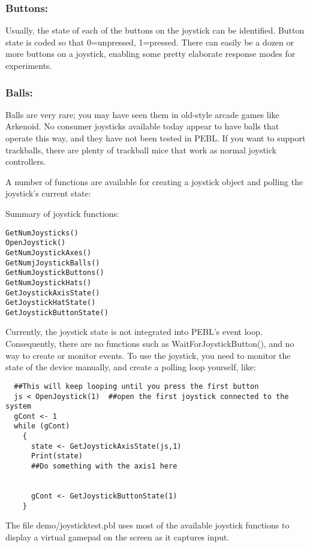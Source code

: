 \subsubsection{Buttons:}
  Usually, the state of each of the buttons on the joystick can be identified.  Button state is coded so that 0=unpressed, 1=pressed.  There  can easily be a dozen or more buttons on a joystick, enabling some pretty elaborate response modes for experiments.

\subsubsection{Balls:} 
Balls are very rare; you may have seen them in old-style arcade games like Arkenoid.   No consumer joysticks available today appear to have balls that operate this way, and they have not been tested in PEBL.  If you want to support trackballs, there are plenty of trackball mice that work as normal joystick controllers.

A number of functions are available for creating a joystick object and polling the joystick's current state:


Summary of joystick functions:
\begin{verbatim}
GetNumJoysticks()
OpenJoystick()
GetNumJoystickAxes()
GetNumjJoystickBalls()
GetNumJoystickButtons()
GetNumJoystickHats()
GetJoystickAxisState()
GetJoystickHatState()
GetJoystickButtonState()
\end{verbatim}

Currently, the joystick state is not integrated into PEBL's event loop.  Consequently, there are no functions such as WaitForJoystickButton(), and no way to create or monitor events.  To use the joystick, you need to monitor the state of the device manually, and create a polling loop yourself, like:


\begin{verbatim}
  ##This will keep looping until you press the first button
  js < OpenJoystick(1)  ##open the first joystick connected to the system  
  gCont <- 1
  while (gCont)
    {
      state <- GetJoystickAxisState(js,1)
      Print(state)
      ##Do something with the axis1 here
      
      
      gCont <- GetJoystickButtonState(1)
    }
\end{verbatim}


The file demo/joysticktest.pbl uses most of the available joystick functions to display a virtual gamepad on the screen as it captures input.

